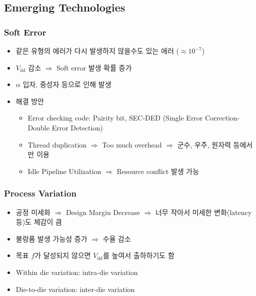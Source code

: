 \subsection{Emerging Technologies}

\subsubsection*{Soft Error}
\begin{itemize}
    \item 같은 유형의 에러가 다시 발생하지 않을수도 있는 에러 ($\approx 10^{-7}$)
    \item $V_{\mathrm{dd}}$ 감소 $\Rightarrow$ Soft error 발생 확률 증가
    \item $\alpha$ 입자, 중성자 등으로 인해 발생
    \item 해결 방안
    \begin{itemize}
        \item Error checking code: Pairity bit, SEC-DED (Single Error Correction-Double Error Detection)
        \item Thread duplication $\Rightarrow$ Too much overhead $\Rightarrow$ 군수, 우주, 원자력 등에서만 이용
        \item Idle Pipeline Utilization $\Rightarrow$ Resource conflict 발생 가능
    \end{itemize}
\end{itemize}

\subsubsection*{Process Variation}
\begin{itemize}
    \item 공정 미세화 $\Rightarrow$ Design Margin Decrease $\Rightarrow$ 너무 작아서 미세한 변화(latency 등)도 체감이 큼
    \item 불랑품 발생 가능성 증가 $\Rightarrow$ 수율 감소
    \item 목표 $f$가 달성되지 않으면 $V_{\mathrm{dd}}$를 높여서 출하하기도 함
    \item Within die variation: intra-die variation
    \item Die-to-die variation: inter-die variation
\end{itemize}
\begin{figures}
\end{figures}
